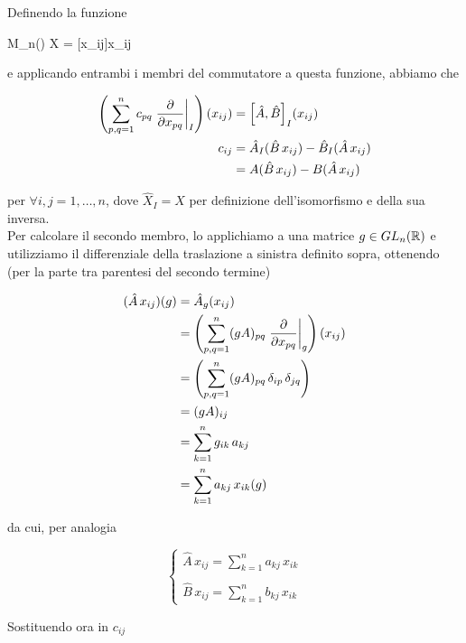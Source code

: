 Definendo la funzione

%
	{M_{n}(\R)}{\R}%
	{X = [x_{ij}]}{x_{ij}}

e applicando entrambi i membri del commutatore a questa funzione, abbiamo che

\begin{align}
	\begin{split}
		\left( \sum_{p,q=1}^{n} c_{pq} \eval{ \pdv{x_{pq}} }_{I} \right)(x_{ij}) &= \comm{\hat{A}}{\hat{B}}_{I} (x_{ij})\\
		c_{ij} &= \hat{A}_{I} (\hat{B} \, x_{ij}) - \hat{B}_{I} (\hat{A} \, x_{ij})\\
		&= A (\hat{B} \, x_{ij}) - B (\hat{A} \, x_{ij})
	\end{split}
\end{align}

per $ \forall i,j = 1,\dots,n $, dove $ \hat{X}_{I} = X $ per definizione dell'isomorfismo e della sua inversa.\\
Per calcolare il secondo membro, lo applichiamo a una matrice $ g \in GL_{n}(\mathbb{R}) $ e utilizziamo il differenziale della traslazione a sinistra definito sopra, ottenendo (per la parte tra parentesi del secondo termine)

\begin{align}
	\begin{split}
		(\hat{A} \, x_{ij})(g) &= \hat{A}_{g} (x_{ij})\\
		&= \left( \sum_{p,q=1}^{n} (g A)_{pq} \eval{ \pdv{x_{pq}} }_{g} \right)(x_{ij})\\
		&= \left( \sum_{p,q=1}^{n} (g A)_{pq} \, \delta_{ip} \, \delta_{jq} \right)\\
		&= (g A)_{ij}\\
		&= \sum_{k=1}^{n} g_{ik} \, a_{kj}\\
		&= \sum_{k=1}^{n} a_{kj} \, x_{ik}(g)
	\end{split}
\end{align}

da cui, per analogia

\begin{equation}
	\begin{cases}
		\hat{A} \, x_{ij} = \displaystyle\sum_{k=1}^{n} a_{kj} \, x_{ik}\\\\
		\hat{B} \, x_{ij} = \displaystyle\sum_{k=1}^{n} b_{kj} \, x_{ik}
	\end{cases}
\end{equation}

Sostituendo ora in $ c_{ij} $

